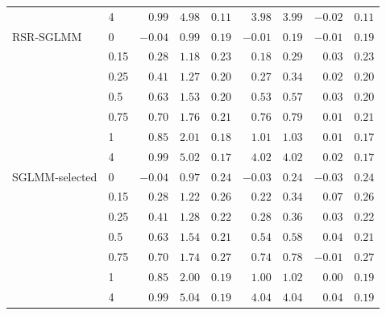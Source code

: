\begin{table}[ht]
\begin{tabular}{llrrrrrrr}
 & 4 & $0.99$ & $4.98$ & $0.11$ & $3.98$ & $3.99$ & $-0.02$ & $0.11$ \\
\addlinespace
RSR-SGLMM & 0 & $-0.04$ & $0.99$ & $0.19$ & $-0.01$ & $0.19$ & $-0.01$ & $0.19$ \\
 & 0.15 & $0.28$ & $1.18$ & $0.23$ & $0.18$ & $0.29$ & $0.03$ & $0.23$ \\
 & 0.25 & $0.41$ & $1.27$ & $0.20$ & $0.27$ & $0.34$ & $0.02$ & $0.20$ \\
 & 0.5 & $0.63$ & $1.53$ & $0.20$ & $0.53$ & $0.57$ & $0.03$ & $0.20$ \\
 & 0.75 & $0.70$ & $1.76$ & $0.21$ & $0.76$ & $0.79$ & $0.01$ & $0.21$ \\
 & 1 & $0.85$ & $2.01$ & $0.18$ & $1.01$ & $1.03$ & $0.01$ & $0.17$ \\
 & 4 & $0.99$ & $5.02$ & $0.17$ & $4.02$ & $4.02$ & $0.02$ & $0.17$ \\
\addlinespace
SGLMM-selected & 0 & $-0.04$ & $0.97$ & $0.24$ & $-0.03$ & $0.24$ & $-0.03$ & $0.24$ \\
 & 0.15 & $0.28$ & $1.22$ & $0.26$ & $0.22$ & $0.34$ & $0.07$ & $0.26$ \\
 & 0.25 & $0.41$ & $1.28$ & $0.22$ & $0.28$ & $0.36$ & $0.03$ & $0.22$ \\
 & 0.5 & $0.63$ & $1.54$ & $0.21$ & $0.54$ & $0.58$ & $0.04$ & $0.21$ \\
 & 0.75 & $0.70$ & $1.74$ & $0.27$ & $0.74$ & $0.78$ & $-0.01$ & $0.27$ \\
 & 1 & $0.85$ & $2.00$ & $0.19$ & $1.00$ & $1.02$ & $0.00$ & $0.19$ \\
 & 4 & $0.99$ & $5.04$ & $0.19$ & $4.04$ & $4.04$ & $0.04$ & $0.19$ \\
\bottomrule
\end{tabular}
\end{table}

